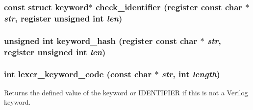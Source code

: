 \subsubsection{\setlength{\rightskip}{0pt plus 5cm}const struct {\bf keyword}$\ast$ check\_\-identifier (register const char $\ast$ {\em str}, register unsigned int {\em len})}\label{keywords_8c_a6}


\subsubsection{\setlength{\rightskip}{0pt plus 5cm}unsigned int keyword\_\-hash (register const char $\ast$ {\em str}, register unsigned int {\em len})\hspace{0.3cm}{\tt  [static]}}\label{keywords_8c_a5}


\subsubsection{\setlength{\rightskip}{0pt plus 5cm}int lexer\_\-keyword\_\-code (const char $\ast$ {\em str}, int {\em length})}\label{keywords_8c_a7}


Returns the defined value of the keyword or IDENTIFIER if this is not a Verilog keyword. 

